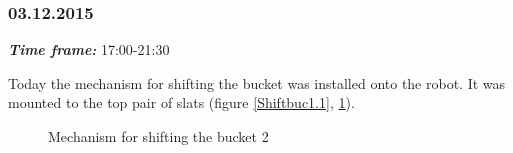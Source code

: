 \subsubsection{03.12.2015}
\textit{\textbf{Time frame:}} 17:00-21:30 

Today the mechanism for shifting the bucket was installed onto the robot. It was mounted to the top pair of slats (figure \ref{Shiftbuc1.1}, \ref{Shiftbuc1.2}).

\begin{figure}[H]
	\begin{minipage}[h]{0.47\linewidth}
		\caption{Mechanism for shifting the bucket 1}
		\label{Shiftbuc1.1}
	\end{minipage}
	\hfill
	\begin{minipage}[h]{0.47\linewidth}
		\caption{Mechanism for shifting the bucket 2}
		\label{Shiftbuc1.2}
	\end{minipage}
\end{figure}

